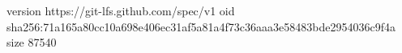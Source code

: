 version https://git-lfs.github.com/spec/v1
oid sha256:71a165a80cc10a698e406ec31af5a81a4f73c36aaa3e58483bde2954036c9f4a
size 87540
